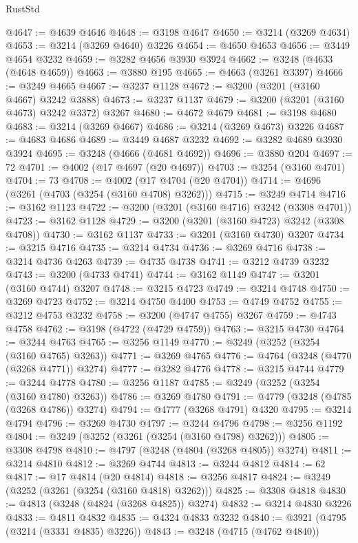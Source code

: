 \begin{lexlean}{RustStd}
\begin{coremodule}
{\begin{coremodule}
{{{{{{{{{{{{{{{{{{{{{{{{{@4647 := @4639 @4646
@4648 := @3198 @4647
@4650 := @3214 (@3269 @4634)
@4653 := @3214 (@3269 @4640) @3226
@4654 := @4650 @4653
@4656 := @3449 @4654 @3232
@4659 := @3282 @4656 @3930 @3924
@4662 := @3248 (@4633 (@4648 @4659))
@4663 := @3880 @195
@4665 := @4663 (@3261 @3397)
@4666 := @3249 @4665
@4667 := @3237 @1128
@4672 := @3200 (@3201 (@3160 @4667) @3242 @3888)
@4673 := @3237 @1137
@4679 := @3200 (@3201 (@3160 @4673) @3242 @3372) @3267
@4680 := @4672 @4679
@4681 := @3198 @4680
@4683 := @3214 (@3269 @4667)
@4686 := @3214 (@3269 @4673) @3226
@4687 := @4683 @4686
@4689 := @3449 @4687 @3232
@4692 := @3282 @4689 @3930 @3924
@4695 := @3248 (@4666 (@4681 @4692))
@4696 := @3880 @204
@4697 := 72
@4701 := @4002 (@17 @4697 (@20 @4697))
@4703 := @3254 (@3160 @4701)
@4704 := 73
@4708 := @4002 (@17 @4704 (@20 @4704))
@4714 := @4696 (@3261 (@4703 (@3254 (@3160 @4708) @3262)))
@4715 := @3249 @4714
@4716 := @3162 @1123
@4722 := @3200 (@3201 (@3160 @4716) @3242 (@3308 @4701))
@4723 := @3162 @1128
@4729 := @3200 (@3201 (@3160 @4723) @3242 (@3308 @4708))
@4730 := @3162 @1137
@4733 := @3201 (@3160 @4730) @3207
@4734 := @3215 @4716
@4735 := @3214 @4734
@4736 := @3269 @4716
@4738 := @3214 @4736 @4263
@4739 := @4735 @4738
@4741 := @3212 @4739 @3232
@4743 := @3200 (@4733 @4741)
@4744 := @3162 @1149
@4747 := @3201 (@3160 @4744) @3207
@4748 := @3215 @4723
@4749 := @3214 @4748
@4750 := @3269 @4723
@4752 := @3214 @4750 @4400
@4753 := @4749 @4752
@4755 := @3212 @4753 @3232
@4758 := @3200 (@4747 @4755) @3267
@4759 := @4743 @4758
@4762 := @3198 (@4722 (@4729 @4759))
@4763 := @3215 @4730
@4764 := @3244 @4763
@4765 := @3256 @1149
@4770 := @3249 (@3252 (@3254 (@3160 @4765) @3263))
@4771 := @3269 @4765
@4776 := @4764 (@3248 (@4770 (@3268 @4771)) @3274)
@4777 := @3282 @4776
@4778 := @3215 @4744
@4779 := @3244 @4778
@4780 := @3256 @1187
@4785 := @3249 (@3252 (@3254 (@3160 @4780) @3263))
@4786 := @3269 @4780
@4791 := @4779 (@3248 (@4785 (@3268 @4786)) @3274)
@4794 := @4777 (@3268 @4791) @4320
@4795 := @3214 @4794
@4796 := @3269 @4730
@4797 := @3244 @4796
@4798 := @3256 @1192
@4804 := @3249 (@3252 (@3261 (@3254 (@3160 @4798) @3262)))
@4805 := @3308 @4798
@4810 := @4797 (@3248 (@4804 (@3268 @4805)) @3274)
@4811 := @3214 @4810
@4812 := @3269 @4744
@4813 := @3244 @4812
@4814 := 62
@4817 := @17 @4814 (@20 @4814)
@4818 := @3256 @4817
@4824 := @3249 (@3252 (@3261 (@3254 (@3160 @4818) @3262)))
@4825 := @3308 @4818
@4830 := @4813 (@3248 (@4824 (@3268 @4825)) @3274)
@4832 := @3214 @4830 @3226
@4833 := @4811 @4832
@4835 := @4324 @4833 @3232
@4840 := @3921 (@4795 (@3214 (@3331 @4835) @3226))
@4843 := @3248 (@4715 (@4762 @4840))
}}}}}}}}}}}}}}}}}}}}}}}}}
\end{coremodule}}
\end{coremodule}
\end{lexlean}
